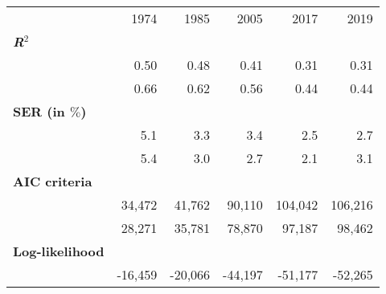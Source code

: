 \begin{tabular}{l|ccccc}
\cline{1-6}
\multicolumn{1}{c}{} &
  \multicolumn{1}{|r}{1974} &
  \multicolumn{1}{r}{1985} &
  \multicolumn{1}{r}{2005} &
  \multicolumn{1}{r}{2017} &
  \multicolumn{1}{r}{2019} \\
\cline{1-6}
\multicolumn{6}{l}{\textbf{\textit{R}$^2$}}  \\ \hline
\multicolumn{1}{l}{\hspace{1em}{Model (A)}} &
  \multicolumn{1}{|r}{0.50} &
  \multicolumn{1}{r}{0.48} &
  \multicolumn{1}{r}{0.41} &
  \multicolumn{1}{r}{0.31} &
  \multicolumn{1}{r}{0.31} \\
\multicolumn{1}{l}{\hspace{1em}{Model (B)}} &
  \multicolumn{1}{|r}{0.66} &
  \multicolumn{1}{r}{0.62} &
  \multicolumn{1}{r}{0.56} &
  \multicolumn{1}{r}{0.44} &
  \multicolumn{1}{r}{0.44} \\ \hline
\multicolumn{6}{l}{\textbf{SER (in $\%$)}}  \\ \hline
\multicolumn{1}{l}{\hspace{1em}{Model (A)}} &
  \multicolumn{1}{|r}{5.1} &
  \multicolumn{1}{r}{3.3} &
  \multicolumn{1}{r}{3.4} &
  \multicolumn{1}{r}{2.5} &
  \multicolumn{1}{r}{2.7} \\
\multicolumn{1}{l}{\hspace{1em}{Model (B)}} &
  \multicolumn{1}{|r}{5.4} &
  \multicolumn{1}{r}{3.0} &
  \multicolumn{1}{r}{2.7} &
  \multicolumn{1}{r}{2.1} &
  \multicolumn{1}{r}{3.1} \\ \hline
\multicolumn{1}{l}{\textbf{AIC criteria}}  \\  \hline
\multicolumn{1}{l}{\hspace{1em}{Model (A)}} &
  \multicolumn{1}{|r}{34,472} &
  \multicolumn{1}{r}{41,762} &
  \multicolumn{1}{r}{90,110} &
  \multicolumn{1}{r}{104,042} &
  \multicolumn{1}{r}{106,216} \\
\multicolumn{1}{l}{\hspace{1em}{Model (B)}} &
  \multicolumn{1}{|r}{28,271} &
  \multicolumn{1}{r}{35,781} &
  \multicolumn{1}{r}{78,870} &
  \multicolumn{1}{r}{97,187} &
  \multicolumn{1}{r}{98,462} \\ \hline
\multicolumn{1}{l}{\textbf{Log-likelihood}}  \\  \hline
\multicolumn{1}{l}{\hspace{1em}{Model (A)}} &
  \multicolumn{1}{|r}{-16,459} &
  \multicolumn{1}{r}{-20,066} &
  \multicolumn{1}{r}{-44,197} &
  \multicolumn{1}{r}{-51,177} &
  \multicolumn{1}{r}{-52,265} \\

\end{tabular}
